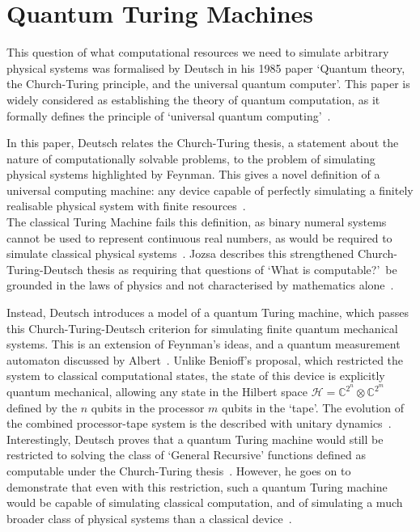 \documentclass{standalone}
\begin{document}
\section{Quantum Turing Machines}\label{sec:QTM}
This question of what computational resources we need to simulate arbitrary physical systems was formalised by Deutsch in his 1985 paper `Quantum theory, the Church-Turing principle, and the universal quantum computer'. This paper is widely considered as establishing the theory of quantum computation, as it formally defines the principle of `universal quantum computing'~\cite{Deutsch1985}. 
\par
In this paper, Deutsch relates the Church-Turing thesis, a statement about the nature of computationally solvable problems, to the problem of simulating physical systems highlighted by Feynman. This gives a novel definition of a universal computing machine: any device capable of perfectly simulating a finitely realisable physical system with finite resources~\cite{Deutsch1985}. \\
The classical Turing Machine fails this definition, as binary numeral systems cannot be used to represent continuous real numbers, as would be required to simulate classical physical systems~\cite{Deutsch1985}. Jozsa describes this strengthened Church-Turing-Deutsch thesis as requiring that questions of `What is computable?'\ be grounded in the laws of physics and not characterised by mathematics alone~\cite{Jozsa1997}.
\par
Instead, Deutsch introduces a model of a quantum Turing machine, which passes this Church-Turing-Deutsch criterion for simulating finite quantum mechanical systems. This is an extension of Feynman's ideas, and a quantum measurement automaton discussed by Albert~\cite{Albert1983}. Unlike Benioff's proposal, which restricted the system to classical computational states, the state of this device is explicitly quantum mechanical, allowing any state in the Hilbert space $\mathcal{H}=\mathbb{C}^{2^{n}} \otimes \mathbb{C}^{2^{m}}$ defined by the $n$ qubits in the processor $m$ qubits in the `tape'. The evolution of the combined processor-tape system is the described with unitary dynamics~\cite{Deutsch1985}. \\
Interestingly, Deutsch proves that a quantum Turing machine would still be restricted to solving the class of `General Recursive' functions defined as computable under the Church-Turing thesis~\cite{Deutsch1985}. However, he goes on to demonstrate that even with this restriction, such a quantum Turing machine would be capable of simulating classical computation, and of simulating a much broader class of physical systems than a classical device~\cite{Deutsch1985}.
\end{document}
